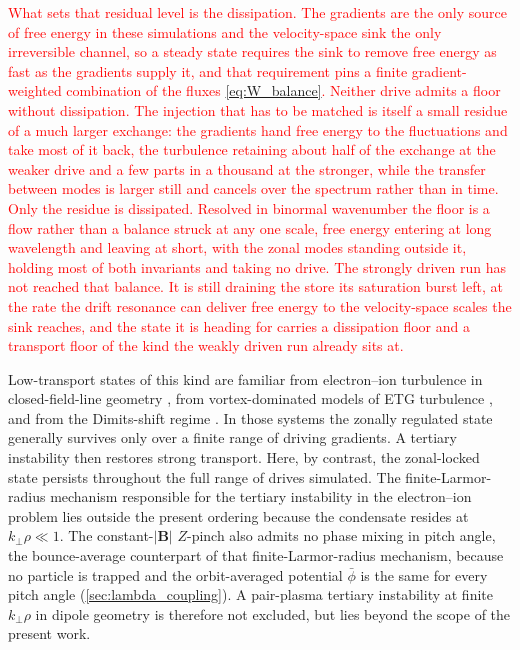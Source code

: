 \documentclass{jpp}
\newcommand{\bB}{\mathbf{B}}
\newcommand{\kperp}{k_\perp}
\begin{document}
\textcolor{red}{What sets that residual level is the dissipation. The gradients are the only source of free energy in these simulations and the velocity-space sink the only irreversible channel, so a steady state requires the sink to remove free energy as fast as the gradients supply it, and that requirement pins a finite gradient-weighted combination of the fluxes \cref{eq:W_balance}. Neither drive admits a floor without dissipation. The injection that has to be matched is itself a small residue of a much larger exchange: the gradients hand free energy to the fluctuations and take most of it back, the turbulence retaining about half of the exchange at the weaker drive and a few parts in a thousand at the stronger, while the transfer between modes is larger still and cancels over the spectrum rather than in time. Only the residue is dissipated. Resolved in binormal wavenumber the floor is a flow rather than a balance struck at any one scale, free energy entering at long wavelength and leaving at short, with the zonal modes standing outside it, holding most of both invariants and taking no drive. The strongly driven run has not reached that balance. It is still draining the store its saturation burst left, at the rate the drift resonance can deliver free energy to the velocity-space scales the sink reaches, and the state it is heading for carries a dissipation floor and a transport floor of the kind the weakly driven run already sits at.}

Low-transport states of this kind are familiar from electron--ion turbulence in closed-field-line geometry \citep{Kobayashi2009,KobayashiRogers2012,BanonNavarro2016}, from vortex-dominated models of ETG turbulence \citep{Nakata2010}, and from the Dimits-shift regime \citep{Dimits2000,KobayashiRogers2012}. In those systems the zonally regulated state generally survives only over a finite range of driving gradients. A tertiary instability then restores strong transport. Here, by contrast, the zonal-locked state persists throughout the full range of drives simulated. The finite-Larmor-radius mechanism responsible for the tertiary instability in the electron--ion problem lies outside the present ordering because the condensate resides at $\kperp\rho\ll1$. The constant-$|\bB|$ $Z$-pinch also admits no phase mixing in pitch angle, the bounce-average counterpart of that finite-Larmor-radius mechanism, because no particle is trapped and the orbit-averaged potential $\bar\phi$ is the same for every pitch angle (\cref{sec:lambda_coupling}). A pair-plasma tertiary instability at finite $\kperp\rho$ in dipole geometry is therefore not excluded, but lies beyond the scope of the present work.
\end{document}
